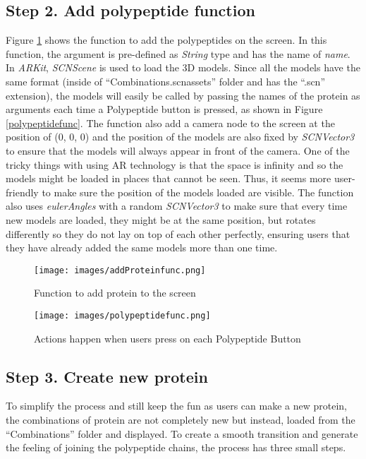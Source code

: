 \subsection{Step 2. Add polypeptide function}
Figure \ref{fig:addProteinfunc} shows the function to add the polypeptides on the screen. In this function, the argument is pre-defined as \emph{String} type and has the name of \emph{name}. In \emph{ARKit}, \emph{SCNScene} is used to load the 3D models. Since all the models have the same format (inside of “Combinations.scnassets” folder and has the “.scn” extension), the models will easily be called by passing the names of the protein as arguments each time a Polypeptide button is pressed, as shown in Figure \ref{polypeptidefunc}. 
The function also add a camera node to the screen at the position of (0, 0, 0) and the position of the models are also fixed by \emph{SCNVector3} to ensure that the models will always appear in front of the camera. One of the tricky things with using AR technology is that the space is infinity and so the models might be loaded in places that cannot be seen. Thus, it seems more user-friendly to make sure the position of the models loaded are visible. The function also uses \emph{eulerAngles} with a random \emph{SCNVector3} to make sure that every time new models are loaded, they might be at the same position, but rotates differently so they do not lay on top of each other perfectly, ensuring users that they have already added the same models more than one time. 
\begin{figure}[!htp]
	\centering
	\texttt{[image: images/addProteinfunc.png]}
	\caption{Function to add protein to the screen}
	\label{fig:addProteinfunc}
\end{figure}

\begin{figure}[!htp]
	\centering
	\texttt{[image: images/polypeptidefunc.png]}
	\caption{Actions happen when users press on each Polypeptide Button}
	\label{fig:polypeptidefunc}
\end{figure}


\subsection{Step 3. Create new protein}
To simplify the process and still keep the fun as users can make a new protein, the combinations of protein are not completely new but instead, loaded from the “Combinations” folder and displayed. To create a smooth transition and generate the feeling of joining the polypeptide chains, the process has three small steps. 

